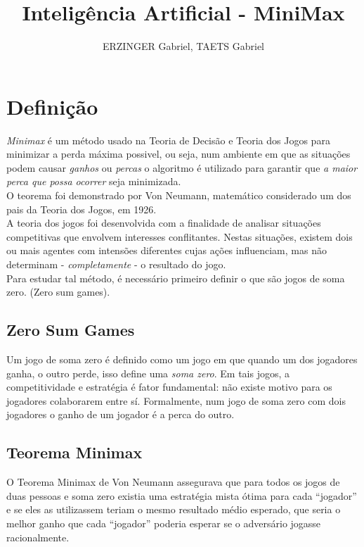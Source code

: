 \documentclass[]{article}
\title{Inteligência Artificial - MiniMax}
\author{ERZINGER Gabriel, TAETS Gabriel}
\begin{document}
\maketitle
	\section{Definição}
	\emph{Minimax} é um método usado na Teoria de Decisão e Teoria dos Jogos para minimizar a perda máxima possivel, ou seja, num ambiente em que as situações podem causar \emph{ganhos} ou \emph{percas} o algoritmo é utilizado para garantir que \textit{a maior perca que possa ocorrer} seja minimizada. \\
	
	O teorema foi demonstrado por Von Neumann, matemático considerado um dos pais da Teoria dos Jogos, em 1926.\\
	
	A teoria dos jogos foi desenvolvida com a finalidade de analisar situações competitivas que envolvem interesses conflitantes. Nestas situações, existem dois ou mais agentes com intensões diferentes cujas ações influenciam,  mas não determinam - \emph{completamente} - o resultado do jogo. \\
	
	Para estudar tal método, é necessário primeiro definir o que são jogos de soma zero. (Zero sum games). 
	
	\subsection{Zero Sum Games}
	Um jogo de soma zero é definido como um jogo em que quando um dos jogadores ganha, o outro perde, isso define uma \emph{soma zero}. Em tais jogos, a competitividade e estratégia é fator fundamental: não existe motivo para os jogadores colaborarem entre sí. Formalmente, num jogo de soma zero com dois jogadores o ganho de um jogador é a perca do outro.
	
	\subsection{Teorema Minimax}
	O Teorema Minimax de Von Neumann assegurava que para todos os jogos de duas pessoas e
	soma zero existia uma estratégia mista ótima para cada “jogador” e se eles as utilizassem
	teriam o mesmo resultado médio esperado, que seria o melhor ganho que cada “jogador”
	poderia esperar se o adversário jogasse racionalmente. \\
	
\end{document}
